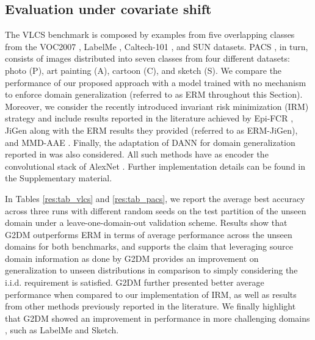 \documentclass{article}
\begin{document}
\subsection{Evaluation under covariate shift}
The VLCS benchmark \cite{fang2013unbiased} is composed by examples from five overlapping classes from the VOC2007 \cite{everingham2010pascal}, LabelMe \cite{russell2008labelme}, Caltech-101 \cite{griffin2007caltech}, and SUN \cite{choi2010exploiting} datasets. PACS \cite{li2017deeper}, in turn, consists of images distributed into seven classes from four different datasets: photo (P), art painting (A), cartoon (C), and sketch (S). We compare the performance of our proposed approach with a model trained with no mechanism to enforce domain generalization (referred to as ERM throughout this Section). Moreover, we consider the recently introduced invariant risk minimization (IRM) strategy \cite{arjovsky2019invariant} and include results reported in the literature achieved by Epi-FCR \cite{li2019episodic}, JiGen \cite{carlucci2019domain} along with the ERM results they provided (referred to as ERM-JiGen), and MMD-AAE \cite{li2018domain}. Finally, the adaptation of DANN for domain generalization reported in \cite{li2019episodic} was also considered. All such methods have as encoder the convolutional stack of AlexNet \cite{krizhevsky2012imagenet}. Further implementation details can be found in the Supplementary material.

In Tables \ref{res:tab_vlcs} and \ref{res:tab_pacs}, we report the average best accuracy across three runs with different random seeds on the test partition of the unseen domain under a leave-one-domain-out validation scheme. Results show that G2DM outperforms ERM in terms of average performance across the unseen domains for both benchmarks, and supports the claim that leveraging source domain information as done by G2DM provides an improvement on generalization to unseen distributions in comparison to simply considering the i.i.d. requirement is satisfied. G2DM further presented better average performance when compared to our implementation of IRM, as well as results from other methods previously reported in the literature. We finally highlight that G2DM showed an improvement in performance in more challenging domains \cite{li2017deeper}, such as LabelMe and Sketch. 
\end{document}
